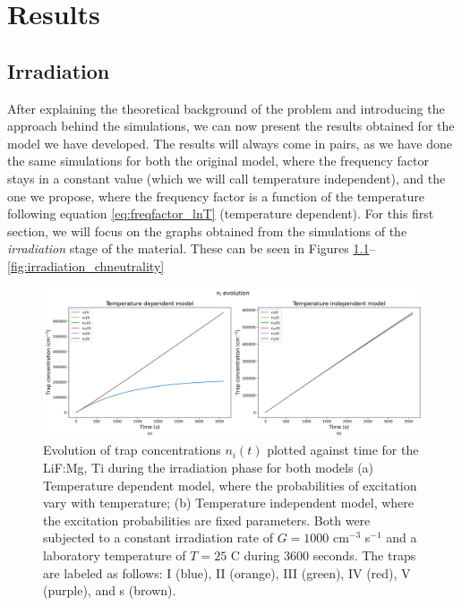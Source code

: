 \chapter{Results}


\section{Irradiation}

After explaining the theoretical background of the problem and introducing the approach behind the simulations, we can now present the results obtained for the model we have developed. The results will always come in pairs, as we have done the same simulations for both the original model, where the frequency factor stays in a constant value (which we will call temperature independent), and the one we propose, where the frequency factor is a function of the temperature following equation \ref{eq:freqfactor_lnT} (temperature dependent). For this first section, we will focus on the graphs obtained from the simulations of the \textit{irradiation} stage of the material. These can be seen in Figures \ref{fig:irradiation_nievolution}-- \ref{fig:irradiation_chneutrality}

\begin{figure}
    \centering
    \includegraphics[width=\textwidth]{Images/Irradiation n_i evolution.png}
    \caption{Evolution of trap concentrations $n_i(t)$  plotted against time for the LiF:Mg, Ti during the irradiation phase for both models (a) Temperature dependent model, where the probabilities of excitation vary with temperature; (b) Temperature independent model, where the excitation probabilities are fixed parameters. Both were subjected to a constant irradiation rate of $G = 1000$ cm$^{-3}$ s$^{-1}$ and a laboratory temperature of $T = 25$ \textdegree C during 3600 seconds. The traps are labeled as follows: I (blue), II (orange), III (green), IV (red), V (purple), and s (brown).}
    \label{fig:irradiation_nievolution}
\end{figure}

